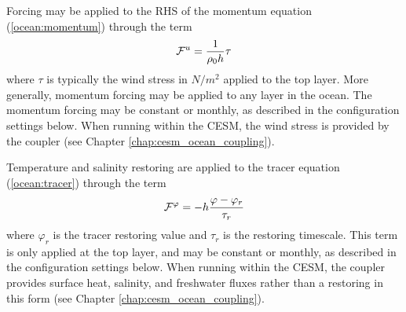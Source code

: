 Forcing may be applied to the RHS of the momentum equation (\ref{ocean:momentum}) through the term 
\begin{equation}
{\cal F}^u = \frac{1}{\rho_0 h}\tau
\end{equation}
where $\tau$ is typically the wind stress in $N/m^2$ applied to the top layer.  More generally, momentum forcing may be applied to any layer in the ocean.  The momentum forcing may be constant or monthly, as described in the configuration settings below.  When running within the CESM, the wind stress is provided by the coupler (see Chapter \ref{chap:cesm_ocean_coupling}).

Temperature and salinity restoring are applied to the tracer equation (\ref{ocean:tracer}) through the term
\begin{equation}
{\cal F}^\varphi = -h\frac{\varphi-\varphi_{r}}{\tau_{r}}
\end{equation}
where $\varphi_{r}$ is the tracer restoring value and $\tau_{r}$ is the restoring timescale.  This term is only applied at the top layer, and may be constant or monthly, as described in the configuration settings below.  When running within the CESM, the coupler provides surface heat, salinity, and freshwater fluxes rather than a restoring in this form (see Chapter \ref{chap:cesm_ocean_coupling}).
